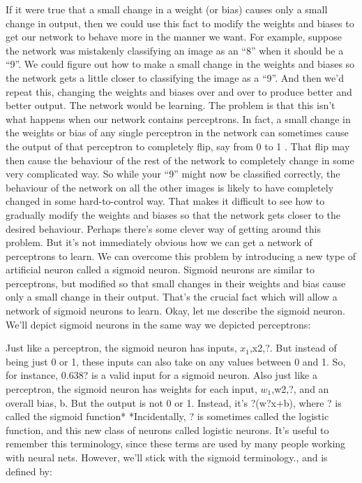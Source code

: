 If it were true that a small change in a weight (or bias) causes only a small change in output, then we could use this fact to modify the weights and biases to get our network to behave more in the manner we want. For example, suppose the network was mistakenly classifying an image as an ``8'' when it should be a ``9''. We could figure out how to make a small change in the weights and biases so the network gets a little closer to classifying the image as a ``9''. And then we'd repeat this, changing the weights and biases over and over to produce better and better output. The network would be learning.
The problem is that this isn't what happens when our network contains perceptrons. In fact, a small change in the weights or bias of any single perceptron in the network can sometimes cause the output of that perceptron to completely flip, say from 0 to 1
. That flip may then cause the behaviour of the rest of the network to completely change in some very complicated way. So while your ``9'' might now be classified correctly, the behaviour of the network on all the other images is likely to have completely changed in some hard-to-control way. That makes it difficult to see how to gradually modify the weights and biases so that the network gets closer to the desired behaviour. Perhaps there's some clever way of getting around this problem. But it's not immediately obvious how we can get a network of perceptrons to learn.
We can overcome this problem by introducing a new type of artificial neuron called a sigmoid neuron. Sigmoid neurons are similar to perceptrons, but modified so that small changes in their weights and bias cause only a small change in their output. That's the crucial fact which will allow a network of sigmoid neurons to learn.
Okay, let me describe the sigmoid neuron. We'll depict sigmoid neurons in the same way we depicted perceptrons: 

Just like a perceptron, the sigmoid neuron has inputs, $x_1$,x2,?. But instead of being just 0 or 1, these inputs can also take on any values between 0 and 1. So, for instance, 0.638? is a valid input for a sigmoid neuron. Also just like a perceptron, the sigmoid neuron has weights for each input, $w_1$,w2,?, and an overall bias, b. But the output is not 0 or 1. Instead, it's ?(w?x+b), where ? is called the sigmoid function* *Incidentally, ? is sometimes called the logistic function, and this new class of neurons called logistic neurons. It's useful to remember this terminology, since these terms are used by many people working with neural nets. However, we'll stick with the sigmoid terminology., and is defined by: 


